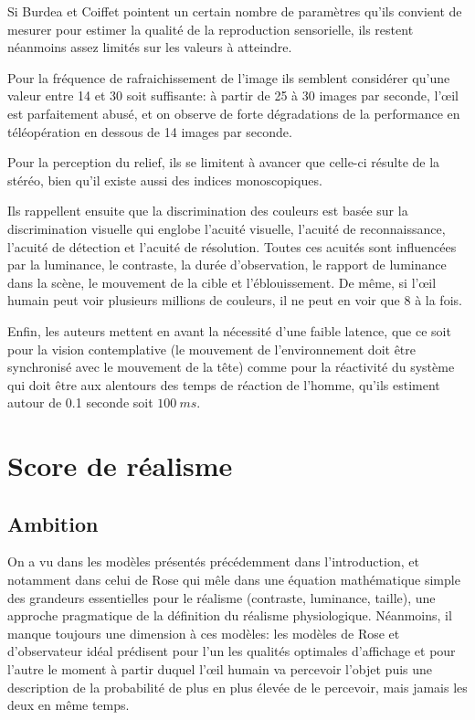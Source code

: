 	\par Si Burdea et Coiffet pointent un certain nombre de paramètres qu'ils convient de mesurer pour estimer la qualité de la reproduction sensorielle, ils restent néanmoins assez limités sur les valeurs à atteindre.
	
	\par Pour la fréquence de rafraichissement de l'image ils semblent considérer qu'une valeur entre 14 et 30 soit suffisante: à partir de 25 à 30 images par seconde, l'œil est parfaitement abusé, et on observe de forte dégradations de la performance en téléopération en dessous de 14 images par seconde.
	
	\par Pour la perception du relief, ils se limitent à avancer que celle-ci résulte de la stéréo, bien qu'il existe aussi des indices monoscopiques.
	
	\par Ils rappellent ensuite que la discrimination des couleurs est basée sur la discrimination visuelle qui englobe l'acuité visuelle, l'acuité de reconnaissance, l'acuité de détection et l'acuité de résolution. Toutes ces acuités sont influencées par la luminance, le contraste, la durée d'observation, le rapport de luminance dans la scène, le mouvement de la cible et l'éblouissement. De même, si l'œil humain peut voir plusieurs millions de couleurs, il ne peut en voir que 8 à la fois.
	
	\par Enfin, les auteurs mettent en avant la nécessité d'une faible latence, que ce soit pour la vision contemplative (le mouvement de l'environnement doit être synchronisé avec le mouvement de la tête) comme pour la réactivité du système qui doit être aux alentours des temps de réaction de l'homme, qu'ils estiment autour de 0.1 seconde soit $100~ms$.
	
	\chapter{Score de réalisme}
	\section{Ambition}	
	\par On a vu dans les modèles présentés précédemment dans l'introduction, et notamment dans celui de Rose qui mêle dans une équation mathématique simple des grandeurs essentielles pour le réalisme (contraste, luminance, taille), une approche pragmatique de la définition du réalisme physiologique. Néanmoins, il manque toujours une dimension à ces modèles: les modèles de Rose et d'observateur idéal prédisent pour l'un les qualités optimales d'affichage et pour l'autre le moment à partir duquel l'œil humain va percevoir l'objet puis une description de la probabilité de plus en plus élevée de le percevoir, mais jamais les deux en même temps.
	
